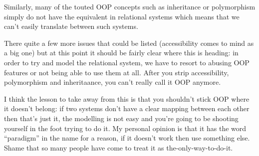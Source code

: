 \documentclass{report}
\begin{document}
Similarly, many of the touted OOP concepts such as inheritance or
polymorphism simply do not have the equivalent in relational systems
which means that we can't easily translate between such systems.

There quite a few more issues that could be listed (accessibility
comes to mind as a big one) but at this point it should be fairly
clear where this is heading: in order to try and model the relational
system, we have to resort to abusing OOP features or not being able to
use them at all. After you strip accessibility, polymorphism and
inheritaance, you can't really call it OOP anymore.

I think the lesson to take away from this is that you shouldn't stick
OOP where it doesn't belong: if two systems don't have a clear mapping
between each other then that's just it, the modelling is not easy and
you're going to be shooting yourself in the foot trying to do it. My
personal opinion is that it has the word ``paradigm'' in the name for
a reason, if it doesn't work then use something else. Shame that so
many people have come to treat it as the-only-way-to-do-it.
\end{document}
